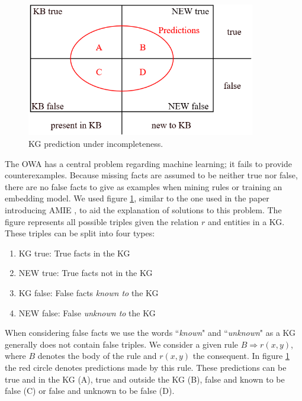 \begin{figure}[htp]
    \centering
    \includegraphics[width=10cm]{figures/kb_venn.png}
    \caption{KG prediction under incompleteness.}
    \label{KB_predictions}
\end{figure}

The OWA has a central problem regarding machine learning; it fails to provide counterexamples. Because missing facts are assumed to be neither true nor false, there are no false facts to give as examples when mining rules or training an embedding model. We used figure \ref{KB_predictions}, similar to the one used in the paper introducing AMIE \cite{amie}, to aid the explanation of solutions to this problem. The figure represents all possible triples given the relation $r$ and entities in a KG. These triples can be split into four types:
\begin{enumerate}
    \item KG true: True facts in the KG
    \item NEW true: True facts not in the KG
    \item KG false: False facts \textit{known to} the KG
    \item NEW false: False \textit{unknown to} the KG
\end{enumerate}
When considering false facts we use the words ``\textit{known}" and ``\textit{unknown}" as a KG generally does not contain false triples. We consider a given rule $B \Rightarrow r(x, y)$, where $B$ denotes the body of the rule and $r(x, y)$ the consequent. In figure \ref{KB_predictions} the red circle denotes predictions made by this rule. These predictions can be true and in the KG (A), true and outside the KG (B), false and known to be false (C) or false and unknown to be false (D). 

